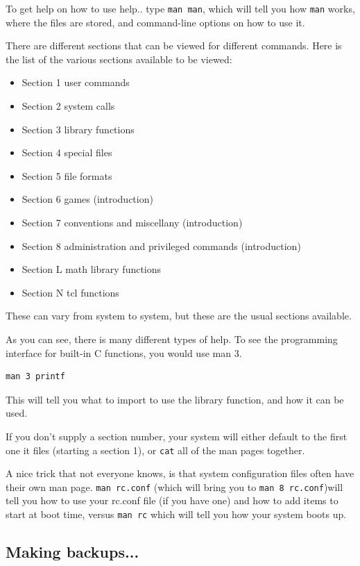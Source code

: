 To get help on how to use help.. type {\tt man man}, which will 
tell you how {\tt man} works, where the files are stored, and 
command-line options on how to use it.

There are different sections that can be viewed for different commands.
Here is the list of the various sections available to be viewed:

\begin{itemize}
\item Section 1
user commands 
\item Section 2
system calls 
\item Section 3
library functions 
\item Section 4
special files 
\item Section 5
file formats 
\item Section 6
games (introduction)
\item Section 7
conventions and miscellany (introduction)
\item Section 8
administration and privileged commands (introduction)
\item Section L
math library functions
\item Section N
tcl functions
\end{itemize}

These can vary from system to system, but these are the usual sections available.

As you can see, there is many different types of help. To see the programming interface for 
built-in C functions, you would use man 3.

\begin{verbatim}
man 3 printf    
\end{verbatim}

This will tell you what to import to use the library function, and how it 
can be used.

If you don't supply a section number, your system will either default to the first one it files (starting a section 1), or {\tt cat}
all of the man pages together.

A nice trick that not everyone knows, is that system configuration files 
often have their own man page. {\tt man rc.conf} (which will bring you to {\tt man 8 rc.conf})will tell you 
how to use your rc.conf file (if you have one) and how to add items to start at boot time, versus {\tt man rc}
which will tell you how your system boots up.


\subsection {Making backups...} 

